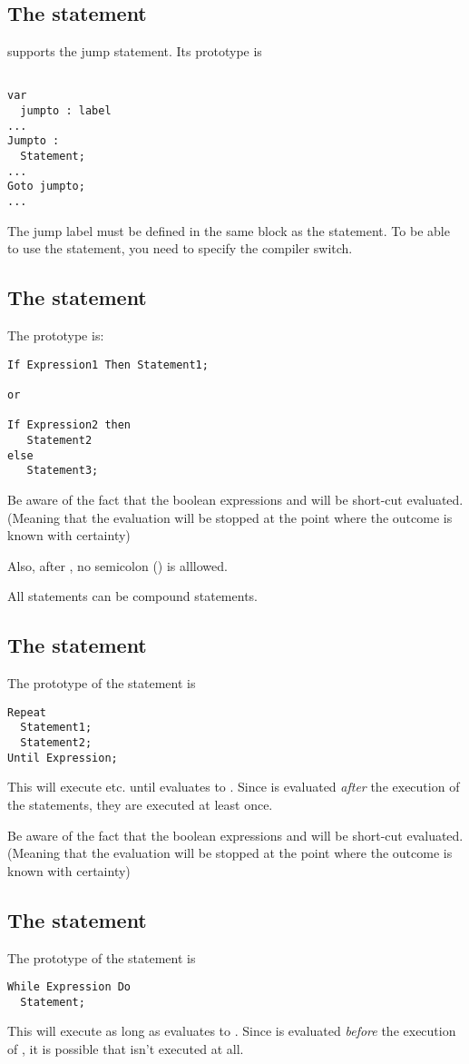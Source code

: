 \documentclass{report}
\begin{document}
\subsection{The  statement}
\fpc supports the  jump statement. Its prototype is
\begin{verbatim}

var
  jumpto : label
...
Jumpto : 
  Statement;
...
Goto jumpto;
...
\end{verbatim}
The jump label must be defined in the same block as the 
statement.
To be able to use the  statement, you need to specify the 
compiler switch.
\subsection{The  statement}
The  prototype is:
\begin{verbatim}
If Expression1 Then Statement1;

or 

If Expression2 then 
   Statement2
else
   Statement3;
\end{verbatim}
Be aware of the fact that the boolean expressions  and
 will be short-cut evaluated. (Meaning that the evaluation
will be stopped at the point where the outcome is known with certainty)

Also, after , no semicolon (\var{;}) is alllowed.

All statements can be compound statements.
\subsection{The  statement}
The prototype of the  statement is
\begin{verbatim}
Repeat
  Statement1;
  Statement2;
Until Expression;
\end{verbatim}
This will execute  etc. until  evaluates to
. Since  is evaluated {\em after} the execution of the
statements, they are executed at least once.

Be aware of the fact that the boolean expressions  and
 will be short-cut evaluated. (Meaning that the evaluation
will be stopped at the point where the outcome is known with certainty)

\subsection{The  statement}
The prototype of the  statement is
\begin{verbatim}
While Expression Do
  Statement;
\end{verbatim}
This will execute  as long as  evaluates to
. Since  is evaluated {\em before} the execution
of , it is possible that  isn't executed at
all.
\end{document}
